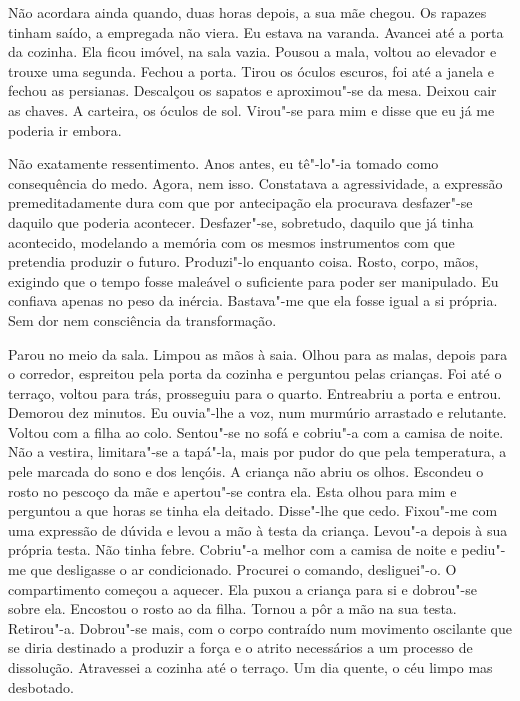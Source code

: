 Não acordara ainda quando, duas horas depois, a sua mãe chegou. Os
rapazes tinham saído, a empregada não viera. Eu estava na varanda.
Avancei até a porta da cozinha. Ela ficou imóvel, na sala vazia. Pousou
a mala, voltou ao elevador e trouxe uma segunda. Fechou a porta. Tirou
os óculos escuros, foi até a janela e fechou as persianas. Descalçou os
sapatos e aproximou"-se da mesa. Deixou cair as chaves. A carteira, os
óculos de sol. Virou"-se para mim e disse que eu já me poderia ir
embora.

Não exatamente ressentimento. Anos antes, eu tê"-lo"-ia tomado como
consequência do medo. Agora, nem isso. Constatava a agressividade, a
expressão premeditadamente dura com que por antecipação ela procurava
desfazer"-se daquilo que poderia acontecer. Desfazer"-se, sobretudo,
daquilo que já tinha acontecido, modelando a memória com os mesmos
instrumentos com que pretendia produzir o futuro. Produzi"-lo enquanto
coisa. Rosto, corpo, mãos, exigindo que o tempo fosse maleável o
suficiente para poder ser manipulado. Eu confiava apenas no peso da
inércia. Bastava"-me que ela fosse igual a si própria. Sem dor nem
consciência da transformação.

Parou no meio da sala. Limpou as mãos à saia. Olhou para as malas,
depois para o corredor, espreitou pela porta da cozinha e perguntou
pelas crianças. Foi até o terraço, voltou para trás, prosseguiu para o
quarto. Entreabriu a porta e entrou. Demorou dez minutos. Eu ouvia"-lhe
a voz, num murmúrio arrastado e relutante. Voltou com a filha ao colo.
Sentou"-se no sofá e cobriu"-a com a camisa de noite. Não a vestira,
limitara"-se a tapá"-la, mais por pudor do que pela temperatura, a pele
marcada do sono e dos lençóis. A criança não abriu os olhos. Escondeu o
rosto no pescoço da mãe e apertou"-se contra ela. Esta olhou para mim e
perguntou a que horas se tinha ela deitado. Disse"-lhe que cedo.
Fixou"-me com uma expressão de dúvida e levou a mão à testa da criança.
Levou"-a depois à sua própria testa. Não tinha febre. Cobriu"-a melhor
com a camisa de noite e pediu"-me que desligasse o ar condicionado.
Procurei o comando, desliguei"-o. O compartimento começou a aquecer. Ela
puxou a criança para si e dobrou"-se sobre ela. Encostou o rosto ao da
filha. Tornou a pôr a mão na sua testa. Retirou"-a. Dobrou"-se mais, com
o corpo contraído num movimento oscilante que se diria destinado a
produzir a força e o atrito necessários a um processo de dissolução.
Atravessei a cozinha até o terraço. Um dia quente, o céu limpo mas
desbotado.

